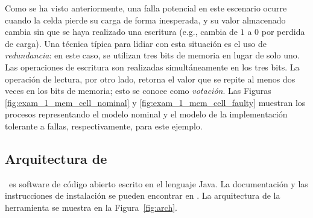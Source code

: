 Como se ha visto anteriormente, una falla potencial en este escenario ocurre cuando la celda pierde su carga de forma inesperada, y su valor almacenado cambia sin que se haya realizado una escritura (e.g., cambia de $1$ a $0$ por perdida de carga). Una técnica típica para lidiar con esta situación es el uso de \emph{redundancia}: 
en este caso, se utilizan tres bits de memoria en lugar de solo uno. Las operaciones de escritura son realizadas simultáneamente en los tres bits. 
La operación de lectura, por otro lado, retorna el valor que se repite al menos dos veces en los bits de memoria; esto se conoce como \emph{votación}. 
Las Figuras \ref{fig:exam_1_mem_cell_nominal} y \ref{fig:exam_1_mem_cell_faulty} muestran los procesos representando el modelo nominal y el modelo de la implementación tolerante a fallas, respectivamente, para este ejemplo. 

\subsection{Arquitectura de {\MaskD}}

\MaskD~es software de código abierto escrito en el lenguaje \textsf{Java}. La documentación y las instrucciones de instalación se pueden encontrar en \cite{MaskD}. La arquitectura de la herramienta se muestra en la Figura~\ref{fig:arch}.

